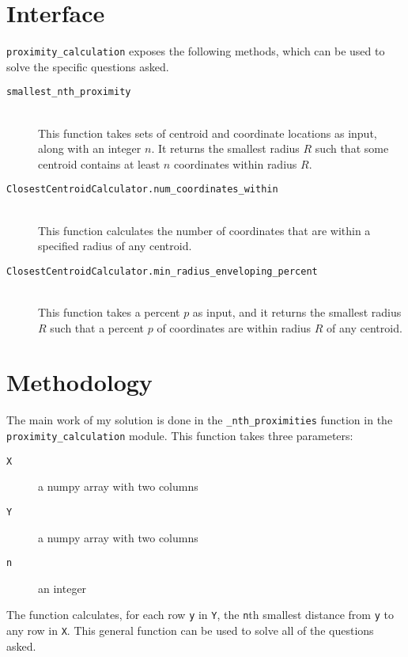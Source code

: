 \documentclass{amsart}
\theoremstyle{definition}
\theoremstyle{definition}
\begin{document}
\section{Interface}
\texttt{proximity\_calculation} exposes the following methods, which can be used to solve the specific questions asked.
\begin{description}
\item[\texttt{smallest\_nth\_proximity}]\ \\
  This function takes sets of centroid and coordinate locations as input, along with an integer $n$.  It returns the smallest radius $R$ such that some centroid contains at least $n$ coordinates within radius $R$.
\item[\texttt{ClosestCentroidCalculator.num\_coordinates\_within}]\ \\
  This function calculates the number of coordinates that are within a specified radius of any centroid.
\item[\texttt{ClosestCentroidCalculator.min\_radius\_enveloping\_percent}]\ \\
  This function takes a percent $p$ as input, and it returns the smallest radius $R$ such that a percent $p$ of coordinates are within radius $R$ of any centroid.
\end{description}

\section{Methodology}
The main work of my solution is done in the \texttt{\_nth\_proximities} function in the \texttt{proximity\_calculation} module.  This function takes three parameters:
\begin{description}
\item[\texttt{X}] a numpy array with two columns
\item[\texttt{Y}] a numpy array with two columns
\item[\texttt{n}] an integer
\end{description}
The function calculates, for each row \texttt{y} in \texttt{Y}, the \texttt{n}th smallest distance from \texttt{y} to any row in \texttt{X}.  This general function can be used to solve all of the questions asked.
\end{document}
